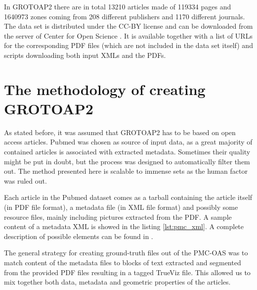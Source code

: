In GROTOAP2 there are in total 13210 articles made of 119334 pages and 1640973 zones coming from 208 different publishers and 1170 different journals. The data set is distributed under the CC-BY license and can be downloaded from the server of Center for Open Science \cite{CeON}. It is available together with a list of URLs for the corresponding PDF files (which are not included in the data set itself) and scripts downloading both input XMLs and the PDFs.

\section{The methodology of creating GROTOAP2}
As stated before, it was assumed that GROTOAP2 has to be based on open access articles. Pubmed was chosen as source of input data, as a great majority of contained articles is associated with extracted metadata. Sometimes their quality might be put in doubt, but the process was designed to automatically filter them out. The method presented here is scalable to immense sets as the human factor was ruled out.

Each article in the Pubmed dataset comes as a tarball containing the article itself (in PDF file format), a metadata file (in XML file format) and possibly some resource files, mainly including pictures extracted from the PDF. A sample content of a metadata XML is showed in the listing \ref{lst:pmc_xml}. A complete description of possible elements can be found in \cite{PubmedXML}.
\pagebreak



The general strategy for creating ground-truth files out of the PMC-OAS was to match content of the metadata files to blocks of text extracted and segmented from the provided PDF files resulting in a tagged TrueViz file. This allowed us to mix together both data, metadata and geometric properties of the articles.

